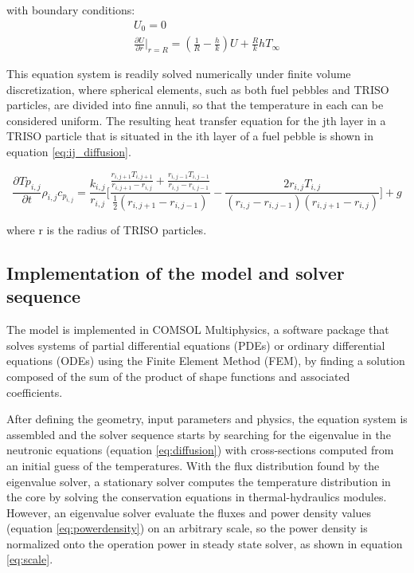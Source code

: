 \documentclass{elsarticle}
\begin{document}
with boundary conditions:
\begin{align}
U_0 = 0\\
\frac{\partial U}{\partial r} |_{r=R} = \left( \frac{1}{R} - \frac{h}{k}\right) U + \frac{R}{k}hT_{\infty}
\end{align}

This equation system is readily solved numerically under finite volume discretization, where spherical elements, such as both fuel pebbles and TRISO particles, are divided into fine annuli, so that the temperature in each can be considered uniform. 
The resulting heat transfer equation for the jth layer in a TRISO particle that is situated in the ith layer of a fuel pebble is shown in equation \ref{eq:ij_diffusion}.

\begin{equation}
    \frac{\partial{Tp_{i,j}}}{\partial{t}}\rho_{i,j}c_{p_{i,j}} = \frac{k_{i,j}}{r_{i,j}}   \Bigg[  \frac {\frac{r_{i,j+1}T_{i,j+1}}{r_{i,j+1}-r_{i,j}}+\frac{r_{i,j-1}T_{i, j-1}}{r_{i,j}-r_ {i, j-1}  }}{\frac{1}{2}(r_ {i, j+1} -r_ {i, j-1} )}-\frac{2r_ {i, j} T_ {i,j} }{(r_ {i,j} -r_ {i,j-1} )(r_ {i, j+1} -r_ {i,j})} \Bigg]  + g  
    \label{eq:ij_diffusion}
\end{equation}

where r is the radius of TRISO particles.





\subsection{Implementation of the model and solver sequence}
\label{sec:implementation}

The model is implemented in COMSOL Multiphysics, a software package that solves systems of partial differential equations (PDEs) or ordinary differential equations (ODEs) using the Finite Element Method (FEM), by finding a solution composed of the sum of the product of shape functions and associated coefficients. 

After defining the geometry, input parameters and physics, the equation system is assembled and the solver sequence starts by searching for the eigenvalue in the neutronic equations (equation \ref{eq:diffusion}) with cross-sections computed from an initial guess of the temperatures. 
With the flux distribution found by the eigenvalue solver, a stationary solver computes the temperature distribution in the core by solving the conservation equations in thermal-hydraulics modules. However, an eigenvalue solver evaluate the fluxes and power density values (equation \ref{eq:powerdensity}) on an arbitrary scale, so the power density is normalized onto the operation power in steady state solver, as shown in equation \ref{eq:scale}.  
\end{document}
